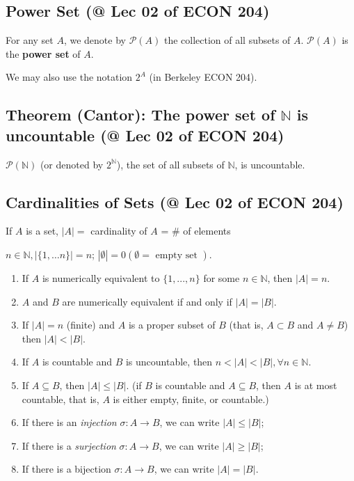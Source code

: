 \documentclass[11pt]{elegantbook}
\begin{document}
\subsection{Power Set \small{(@ Lec 02 of ECON 204)}}
\begin{definition}
    For any set $A$, we denote by $\mathcal{P}(A)$ the collection of all subsets of $A$. $\mathcal{P}(A)$ is the \textbf{power set} of $A$.
\end{definition}
We may also use the notation $2^A$ (in Berkeley ECON 204).

\subsection{Theorem (Cantor): The power set of $\mathbb{N}$ is uncountable \small{(@ Lec 02 of ECON 204)}}
\begin{theorem}[Cantor]
    $\mathcal{P}(\mathbb{N})$ (or denoted by $2^\mathbb{N}$), the set of all subsets of $\mathbb{N}$, is uncountable.
\end{theorem}

\subsection{Cardinalities of Sets \small{(@ Lec 02 of ECON 204)}}
\begin{definition}[Cardinality]
    If $A$ is a set, $|A|=$ cardinality of $A$ = $\#$ of elements
\end{definition}
$n \in \mathbb{N},|\{1, \ldots n\}|=n$; $|\emptyset|=0(\emptyset=\text { empty set })$.

\begin{proposition}
    \begin{enumerate}
        \item If $A$ is numerically equivalent to $\{1,...,n\}$ for some $n\in \mathbb{N}$, then $|A|=n$.
        \item $A$ and $B$ are numerically equivalent if and only if $|A|=|B|$.
        \item If $|A| = n$ (finite) and $A$ is a proper subset of $B$ (that is, $A\subset B$ and $A \neq B$) then $|A|<|B|$.
        \item If $A$ is countable and $B$ is uncountable, then $n<|A|<|B|, \forall n\in\mathbb{N}$.
        \item If $A\subseteq B$, then $|A|\leq|B|$. (if $B$ is countable and $A\subseteq B$, then $A$ is at most countable, that is, $A$ is either empty, finite, or countable.)
        \item If there is an \textit{injection} $\sigma:A \rightarrow B$, we can write $|A|\leq|B|$;
        \item If there is a \textit{surjection} $\sigma:A \rightarrow B$, we can write $|A|\geq|B|$;
        \item If there is a bijection $\sigma:A \rightarrow B$, we can write $|A|=|B|$.
    \end{enumerate}
\end{proposition}
\end{document}
